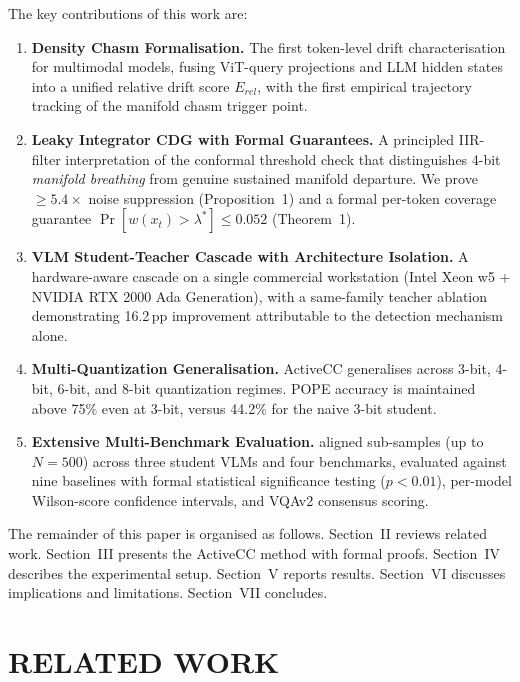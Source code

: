 \documentclass{ieeetmlcn}
\begin{document}
The key contributions of this work are:
\begin{enumerate}
\item \textbf{Density Chasm Formalisation.} The first token-level drift
  characterisation for multimodal models, fusing ViT-query projections
  and LLM hidden states into a unified relative drift score $E_{rel}$,
  with the first empirical trajectory tracking of the manifold chasm
  trigger point.

\item \textbf{Leaky Integrator CDG with Formal Guarantees.} A principled
  IIR-filter interpretation of the conformal threshold check that
  distinguishes 4-bit \emph{manifold breathing} from genuine sustained
  manifold departure. We prove $\geq 5.4\times$ noise suppression
  (Proposition~1) and a formal per-token coverage guarantee
  $\Pr[w(x_t)>\lambda^*]\leq 0.052$ (Theorem~1).
\item \textbf{VLM Student-Teacher Cascade with Architecture Isolation.}
  A hardware-aware cascade on a single commercial workstation (Intel
  Xeon w5 + NVIDIA RTX 2000 Ada Generation), with a same-family teacher ablation
  demonstrating 16.2\,pp improvement attributable to the detection
  mechanism alone.
\item \textbf{Multi-Quantization Generalisation.} ActiveCC generalises
  across 3-bit, 4-bit, 6-bit, and 8-bit quantization regimes. POPE
  accuracy is maintained above 75\% even at 3-bit, versus 44.2\% for
  the naive 3-bit student.
\item \textbf{Extensive Multi-Benchmark Evaluation.} aligned sub-samples (up to $N=500$) across three student VLMs and four benchmarks, evaluated against nine baselines with formal statistical significance testing ($p<0.01$), per-model Wilson-score confidence intervals, and VQAv2 consensus scoring.
\end{enumerate}

The remainder of this paper is organised as follows. Section~II reviews
related work. Section~III presents the ActiveCC method with formal
proofs. Section~IV describes the experimental setup. Section~V reports
results. Section~VI discusses implications and limitations.
Section~VII concludes.

\section{RELATED WORK}
\end{document}
